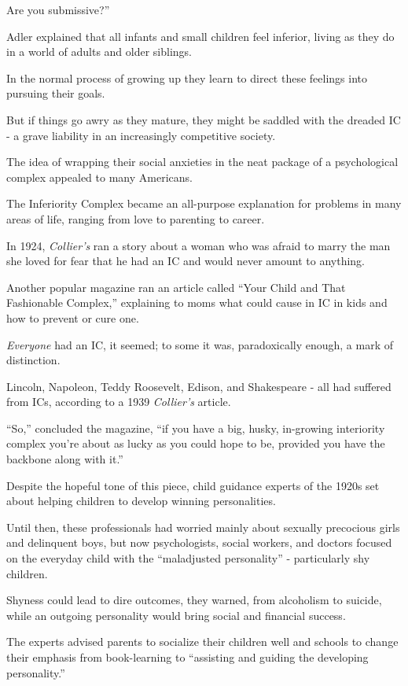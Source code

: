 \documentclass[oneside]{article}
\numberwithin{equation}{section}
\begin{document}
Are you submissive?''

Adler explained that all infants and small children feel inferior, living as they do in a world of adults and older siblings.

In the normal process of growing up they learn to direct these feelings into pursuing their goals.

But if things go awry as they mature, they might be saddled with the dreaded IC - a grave liability in an increasingly competitive society.

%
The idea of wrapping their social anxieties in the neat package of a psychological complex appealed to many Americans.

The Inferiority Complex became an all-purpose explanation for problems in many areas of life, ranging from love to parenting to career.

In 1924, \textit{Collier's} ran a story about a woman who was afraid to marry the man she loved for fear that he had an IC and would never amount to anything.

Another popular magazine ran an article called ``Your Child and That Fashionable Complex,'' explaining to moms what could cause in IC in kids and how to prevent or cure one.

\textit{Everyone} had an IC, it seemed; to some it was, paradoxically enough, a mark of distinction.

Lincoln, Napoleon, Teddy Roosevelt, Edison, and Shakespeare - all had suffered from ICs, according to a 1939 \textit{Collier's} article.

``So,'' concluded the magazine, ``if you have a big, husky, in-growing interiority complex you're about as lucky as you could hope to be, provided you have the backbone along with it.''

%
Despite the hopeful tone of this piece, child guidance experts of the 1920s set about helping children to develop winning personalities.

Until then, these professionals had worried mainly about sexually precocious girls and delinquent boys, but now psychologists, social workers, and doctors focused on the everyday child with the ``maladjusted personality'' - particularly shy children.

Shyness could lead to dire outcomes, they warned, from alcoholism to suicide, while an outgoing personality would bring social and financial success.

The experts advised parents to socialize their children well and schools to change their emphasis from book-learning to ``assisting and guiding the developing personality.''
\end{document}
